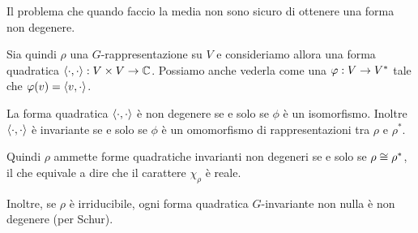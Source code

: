 	Il problema che quando faccio la media non sono sicuro di ottenere una forma non degenere.
	
	Sia quindi $\rho$ una $G$-rappresentazione su $V$ e consideriamo allora una forma quadratica $\langle\cdot , \cdot\rangle: V \times V \rightarrow \mathbb C$.
	Possiamo anche vederla come una $\varphi: V \rightarrow V^*$ tale che $\varphi(v) = \langle v , \cdot\rangle$. 
	
	\begin{myprop}
		La forma quadratica $\langle\cdot , \cdot\rangle$ è non degenere se e solo se $\phi$ è un isomorfismo. Inoltre $\langle\cdot , \cdot\rangle $ è invariante se e solo se $\phi$ è un omomorfismo di rappresentazioni tra $\rho$ e $\rho^*$.
	\end{myprop}
	
	Quindi $\rho$ ammette forme quadratiche invarianti non degeneri se e solo se $\rho \cong \rho^*$, il che equivale a dire che il carattere $\chi_\rho$ è reale.
	
	Inoltre, se $\rho$ è irriducibile, ogni forma quadratica $G$-invariante non nulla è non degenere (per Schur).

	
	
	
	